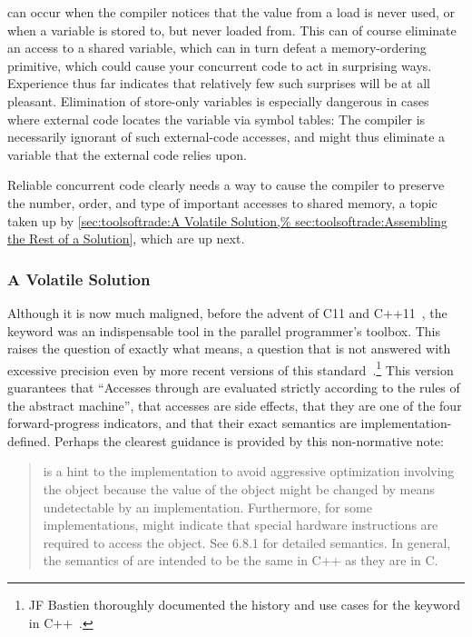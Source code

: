 \begin{description}[labelsep=.4em]
\item[Dead-code elimination] can occur when the compiler notices that
the value from a load is never used, or when a variable is stored to,
but never loaded from.
This can of course eliminate an access to a shared variable, which
can in turn defeat a memory-ordering primitive, which could cause your
concurrent code to act in surprising ways.
Experience thus far indicates that relatively few such surprises will
be at all pleasant.
Elimination of store-only variables is especially dangerous in cases
where external code locates the variable via symbol tables:
The compiler is necessarily ignorant of such external-code accesses,
and might thus eliminate a variable that the external code relies upon.

\end{description}

Reliable concurrent code clearly needs a way to cause the compiler to
preserve the number, order, and type of important accesses to shared
memory, a topic taken up by
\cref{sec:toolsoftrade:A Volatile Solution,%
sec:toolsoftrade:Assembling the Rest of a Solution},
which are up next.

\subsubsection{A Volatile Solution}
\label{sec:toolsoftrade:A Volatile Solution}

Although it is now much maligned, before the advent of C11 and
C++11~\cite{PeteBecker2011N3242}, the  keyword was an
indispensable tool in the parallel programmer's toolbox.
This raises the question of exactly what  means,
a question that is not answered with excessive precision even
by more recent versions of this standard~\cite{RichardSmith2019N4800}.\footnote{
	JF Bastien thoroughly documented the history and use cases
	for the  keyword in
	C++~\cite{JFBastien2018DeprecatingVolatile}.}
This version guarantees that ``Accesses through 
 are evaluated strictly according to the rules of the
abstract machine'',
that  accesses are side effects,
that they are one of the four forward-progress indicators,
and that their exact semantics are implementation-defined.
Perhaps the clearest guidance is provided by this non-normative note:

\begin{quote}
	 is a hint to the implementation to avoid
	aggressive optimization involving the object because the value
	of the object might be changed by means undetectable by an
	implementation.
	Furthermore, for some implementations,  might indicate
	that special hardware instructions are required to access
	the object.
	See 6.8.1 for detailed semantics.
	In general, the semantics of  are intended to be the
	same in C++ as they are in C.
\end{quote}

